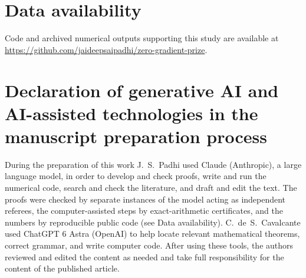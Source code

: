 \documentclass[5p,times]{elsarticle}
\theoremstyle{definition}
\begin{document}
\section*{Data availability}
{\sloppy Code and archived numerical outputs supporting this study are available at \url{https://github.com/jaideepsaipadhi/zero-gradient-prize}.\par}

\section*{Declaration of generative AI and AI-assisted technologies in the manuscript preparation process}
During the preparation of this work J.~S.~Padhi used Claude (Anthropic), a large language model, in order to develop and check proofs, write and run the numerical code, search and check the literature, and draft and edit the text. The proofs were checked by separate instances of the model acting as independent referees, the computer-assisted steps by exact-arithmetic certificates, and the numbers by reproducible public code (see Data availability). C.~de~S.~Cavalcante used ChatGPT 6 Astra (OpenAI) to help locate relevant mathematical theorems, correct grammar, and write computer code. After using these tools, the authors reviewed and edited the content as needed and take full responsibility for the content of the published article.

{\small


}
\end{document}
